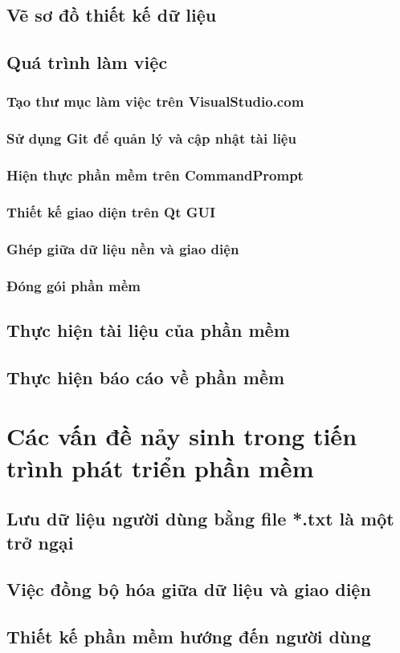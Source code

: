 \documentclass[12pt,a4paper]{report}
\begin{document}
	\section{Vẽ sơ đồ thiết kế dữ liệu}
	\section{Quá trình làm việc}
		\subsection{Tạo thư mục làm việc trên VisualStudio.com}
		\subsection{Sử dụng Git để quản lý và cập nhật tài liệu}
		\subsection{Hiện thực phần mềm trên CommandPrompt}
		\subsection{Thiết kế giao diện trên Qt GUI}
		\subsection{Ghép giữa dữ liệu nền và giao diện}
		\subsection{Đóng gói phần mềm}
	\section{Thực hiện tài liệu của phần mềm}
	\section{Thực hiện báo cáo về phần mềm}
\chapter{Các vấn đề nảy sinh trong tiến trình phát triển phần mềm}
	\section{Lưu dữ liệu người dùng bằng file *.txt là một trở ngại}
	\section{Việc đồng bộ hóa giữa dữ liệu và giao diện}
	\section{Thiết kế phần mềm hướng đến người dùng}
\end{document}
